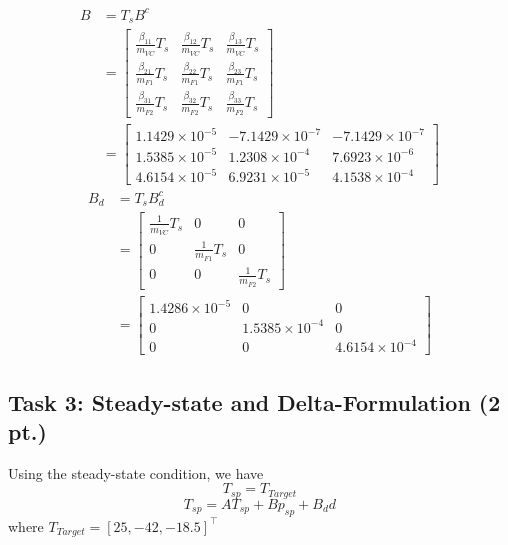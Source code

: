 \documentclass[a4paper,twoside,11pt]{article}
\numberwithin{equation}{section}
\begin{document}
\begin{equation*}
\begin{split}
    B &= 
    T_sB^c \\
    &= 
    \begin{bmatrix}
    \frac{\beta_{11}}{m_{VC}}T_s & \frac{\beta_{12}}{m_{VC}}T_s & \frac{\beta_{13}}{m_{VC}}T_s \\
    \frac{\beta_{21}}{m_{F1}}T_s & \frac{\beta_{22}}{m_{F1}}T_s & \frac{\beta_{23}}{m_{F1}}T_s \\
    \frac{\beta_{31}}{m_{F2}}T_s & \frac{\beta_{32}}{m_{F2}}T_s & \frac{\beta_{33}}{m_{F2}}T_s 
    \end{bmatrix}\\
    &=
    \begin{bmatrix}
    1.1429\times10^{-5} & -7.1429\times10^{-7} & -7.1429\times10^{-7} \\ 
    1.5385\times10^{-5} & 1.2308\times10^{-4} & 7.6923\times10^{-6} \\
    4.6154\times10^{-5} & 6.9231\times10^{-5} & 4.1538\times10^{-4}
    \end{bmatrix}
\end{split}
\end{equation*}
\begin{equation*}
\begin{split}
    B_d &= 
    T_sB_d^c \\
    &= 
    \begin{bmatrix}
    \frac{1}{m_{VC}}T_s & 0 & 0 \\
    0 & \frac{1}{m_{F1}}T_s & 0 \\
    0 & 0 & \frac{1}{m_{F2}}T_s 
    \end{bmatrix}\\
    &=
    \begin{bmatrix}
    1.4286\times10^{-5} & 0 & 0\\
    0 & 1.5385\times10^{-4} & 0\\
    0 & 0 & 4.6154\times10^{-4}
    \end{bmatrix}
\end{split}
\end{equation*}

\subsection{Task 3: Steady-state and Delta-Formulation (2 pt.)}

Using the steady-state condition, we have
\begin{equation}
    T_{sp} = T_{Target}
\end{equation}
\begin{equation}
    T_{sp} = AT_{sp}+Bp_{sp}+B_dd
\end{equation}
where $T_{Target} = [25, -42, -18.5]^\top$
\end{document}
